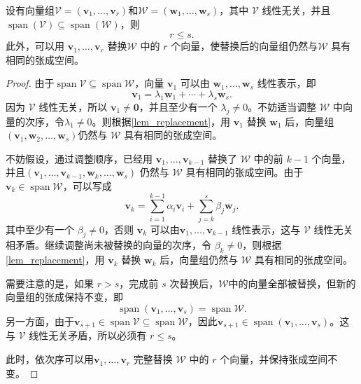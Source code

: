 \begin{theorem}[交换定理]
    \label{thm_exchange}
    设有向量组\( \mathcal V=(\bm v_1,\ldots,\bm v_r) \)和\( \mathcal W=(\bm w_1,\ldots,\bm w_s) \)，其中 \(\mathcal V\) 线性无关，并且\( \operatorname{span}(\mathcal{V}) \subseteq \operatorname{span}(\mathcal{W}) \)，则
    \[
        r\leq s.
    \]
    此外，可以用 \(\bm v_1,\ldots,\bm v_r\) 替换\(\mathcal W\) 中的 \(r\) 个向量，使替换后的向量组仍然与\(\mathcal W\) 具有相同的张成空间。
\end{theorem}
\begin{proof}
    由于\(\operatorname{span}\mathcal V \subseteq \operatorname{span}\mathcal W\)，向量 \(\bm v_1\) 可以由 \(\bm w_1,\ldots,\bm w_s\) 线性表示，即
    \[
        \bm v_1
        =\lambda_1\bm w_1+\cdots+\lambda_s\bm w_s.
    \]
    因为 \(\mathcal V\) 线性无关，所以 \(\bm v_1\ne\bm 0\)，并且至少有一个 \(\lambda_j\ne0\)。不妨适当调整 \(\mathcal W\) 中向量的次序，令\(\lambda_1\ne0\)。则根据\cref{lem_replacement}，用 \(\bm v_1\) 替换 \(\bm w_1\) 后，向量组\( (\bm v_1,\bm w_2,\ldots,\bm w_s) \)仍然与 \(\mathcal W\) 具有相同的张成空间。

    不妨假设，通过调整顺序，已经用 \(\bm v_1,\ldots,\bm v_{k-1}\) 替换了 \(\mathcal W\) 中的前 \(k-1\) 个向量，并且\((\bm v_1,\ldots,\bm v_{k-1},\bm w_k,\ldots,\bm w_s) \) 仍然与 \(\mathcal W\) 具有相同的张成空间。由于
    \(\bm v_k\in\operatorname{span}\mathcal W\)，可以写成
    \[
        \bm v_k
        =\sum_{i=1}^{k-1}\alpha_i\bm v_i
        +\sum_{j=k}^{s}\beta_j\bm w_j.
    \]
    其中至少有一个 \(\beta_j\ne0\)，否则 \(\bm v_k\) 可以由\(\bm v_1,\ldots,\bm v_{k-1}\) 线性表示，这与 \(\mathcal V\) 线性无关相矛盾。继续调整尚未被替换的向量的次序，令 \(\beta_k\ne0\)，则根据\cref{lem_replacement}，用 \(\bm v_k\) 替换 \(\bm w_k\) 后，向量组仍然与 \(\mathcal W\) 具有相同的张成空间。

    需要注意的是，如果 \(r>s\)，完成前 \(s\) 次替换后，\( \mathcal{W} \)中的向量全部被替换，但新的向量组的张成保持不变，即
    \[
        \operatorname{span}(\bm v_1,\ldots,\bm v_s)
        =\operatorname{span}\mathcal W.
    \]
    另一方面，由于\( \bm v_{s+1}\in\operatorname{span}\mathcal V \subseteq\operatorname{span}\mathcal W \)，因此\( \bm v_{s+1}\in\operatorname{span}(\bm v_1,\ldots,\bm v_s) \)。这与 \(\mathcal V\) 线性无关矛盾，所以必须有 \(r\leq s\)。

    此时，依次序可以用\(\bm v_1,\ldots,\bm v_r\) 完整替换 \(\mathcal W\) 中的 \(r\) 个向量，并保持张成空间不变。
\end{proof}

